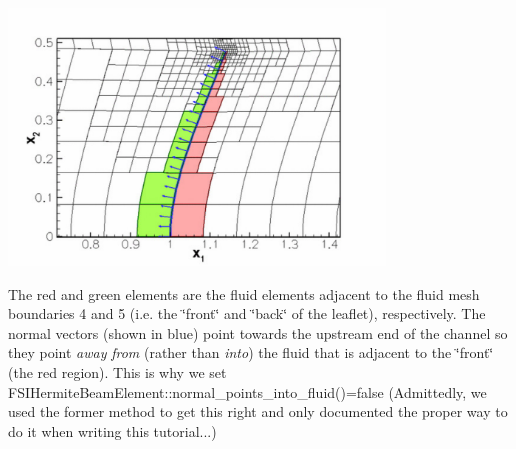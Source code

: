 \begin{DoxyEnumerate}
\begin{DoxyEnumerate}
\begin{DoxyImage}
\includegraphics[width=0.75\textwidth]{front_and_back}
\end{DoxyImage}
 The red and green elements are the fluid elements adjacent to the fluid mesh boundaries 4 and 5 (i.\+e. the \char`\"{}front\char`\"{} and \char`\"{}back\char`\"{} of the leaflet), respectively. The normal vectors (shown in blue) point towards the upstream end of the channel so they point {\itshape away} {\itshape from} (rather than {\itshape into}) the fluid that is adjacent to the \char`\"{}front\char`\"{} (the red region). This is why we set {\ttfamily F\+S\+I\+Hermite\+Beam\+Element\+::normal\+\_\+points\+\_\+into\+\_\+fluid()=false} (Admittedly, we used the former method to get this right and only documented the proper way to do it when writing this tutorial...) ~\newline
~\newline


\end{DoxyEnumerate}
\end{DoxyEnumerate}
